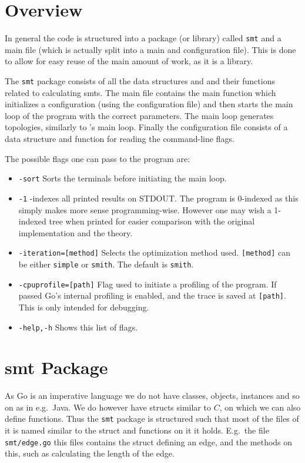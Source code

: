 \section{Overview}
\label{sec:overview-1}

In general the code is structured into a package (or library) called
\texttt{smt} and a main file (which is actually split into a main and
configuration file). This is done to allow for easy reuse of the main amount of
work, as it is a library.

The \texttt{smt} package consists of all the data structures and and their
functions related to calculating \acp{smt}. The main file contains the main
function which initializes a configuration (using the configuration file) and
then starts the main loop of the program with the correct parameters. The main
loop generates topologies, similarly to \citeauthor{smith1992}'s main loop.
Finally the configuration file consists of a data structure and function for
reading the command-line flags.

The possible flags one can pass to the program are:
\begin{itemize}
\item \texttt{-sort} \quad Sorts the terminals before initiating the main loop.
\item \texttt{-1} -indexes all printed results on STDOUT. The program is
  0-indexed as this simply makes more sense programming-wise. However one may
  wish a 1-indexed tree when printed for easier comparison with the original
  implementation and the theory.
\item \texttt{-iteration=[method]} \quad Selects the optimization method used.
  \texttt{[method]} can be either \texttt{simple} or \texttt{smith}. The default
  is \texttt{smith}.
\item \texttt{-cpuprofile=[path]} \quad Flag used to initiate a profiling of the
  program. If passed Go's internal profiling is enabled, and the trace is saved
  at \texttt{[path]}. This is only intended for debugging.
\item \texttt{-help,-h} \quad Shows this list of flags. 
\end{itemize}

\section{\acs{smt} Package}
\label{sec:smt-package}

As Go is an imperative language we do not have classes, objects, instances and
so on as in e.g.\ Java. We do however have structs similar to $C$, on which we
can also define functions. Thus the \texttt{smt} package is structured such that
most of the files of it is named similar to the struct and functions on it it
holds. E.g.\ the file \texttt{smt/edge.go} this files contains the struct
defining an edge, and the methods on this, such as calculating the length of the
edge.

